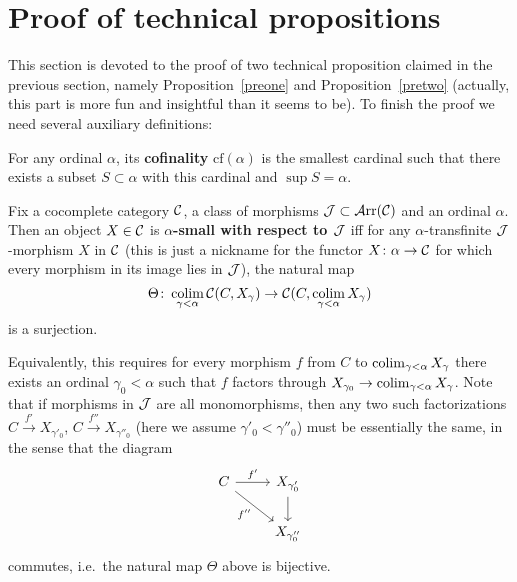 \documentclass[twoside]{article}
\begin{document}
\section{Proof of technical propositions}

This section is devoted to the proof of two technical proposition claimed in the previous section, namely Proposition~\ref{preone} and Proposition~\ref{pretwo} (actually, this part is more fun and insightful than it seems to be). To finish the proof we need several auxiliary definitions:

\begin{defn}
For any ordinal $\alpha$, its \textbf{cofinality} $\mathrm{cf}(\alpha)$ is the smallest cardinal such that there exists a subset $S \subset \alpha$ with this cardinal and $\sup S = \alpha$.
\end{defn}

\begin{defn}
Fix a cocomplete category ${\mathcal{C}}$, a class of morphisms ${\mathcal{J}} \subset \mathcal{A}\mathrm{rr}({\mathcal{C}})$ and an ordinal $\alpha$. Then an object $X \in {\mathcal{C}}$ is \textbf{$\alpha$-small with respect to ${\mathcal{J}}$} iff for any $\alpha$-transfinite ${\mathcal{J}}$-morphism $X$ in ${\mathcal{C}}$ (this is just a nickname for the functor $X\colon \alpha  \rightarrow {\mathcal{C}}$ for which every morphism in its image lies in ${\mathcal{J}}$), the natural map
$$\Theta\colon \operatorname*{\mathrm{colim}}_{\gamma < \alpha} {\mathcal{C}}(C, X_\gamma) \rightarrow {\mathcal{C}}(C, \operatorname*{\mathrm{colim}}_{\gamma < \alpha} X_\gamma)$$
is a surjection.
\end{defn}

\begin{rem}
Equivalently, this requires for every morphism $f$ from $C$ to $\operatorname*{\mathrm{colim}}_{\gamma < \alpha} X_\gamma$ there exists an ordinal $\gamma_0 < \alpha$ such that $f$ factors through $X_{\gamma_0} \rightarrow \operatorname*{\mathrm{colim}}_{\gamma < \alpha} X_\gamma$. Note that if morphisms in ${\mathcal{J}}$ are all monomorphisms, then any two such factorizations $C \xrightarrow{f'} X_{\gamma'_0}$, $C \xrightarrow{f''} X_{\gamma''_0}$ (here we assume $\gamma'_0 < \gamma''_0$) must be essentially the same, in the sense that the diagram
$$\begin{tikzcd}
    C \ar[r, "f'"] \ar[rd, "f''"']& X_{\gamma'_0}\ar[d]\\
& X_{\gamma''_0}
\end{tikzcd}$$
commutes, i.e.\ the natural map $\Theta$ above is bijective.
\end{rem}
\end{document}
